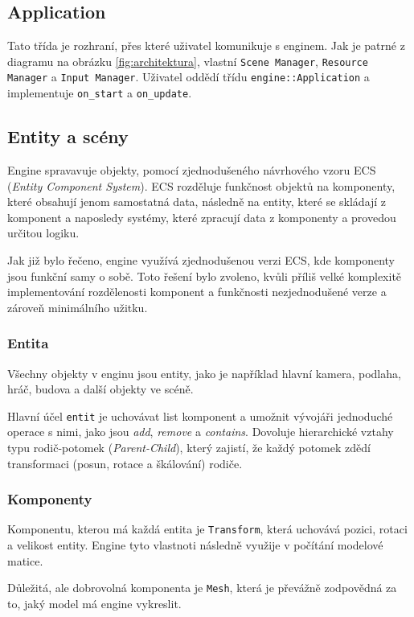 \documentclass[12pt,a4paper]{article}
\begin{document}
\subsection{Application}
Tato třída je rozhraní, přes které uživatel komunikuje s enginem. Jak je patrné z diagramu na obrázku \ref{fig:architektura}, vlastní \texttt{Scene Manager}, \texttt{Resource Manager} a \texttt{Input Manager}. Uživatel oddědí třídu \texttt{engine::Application} a implementuje \texttt{on\_start} a \texttt{on\_update}.

\subsection{Entity a scény}
Engine spravavuje objekty, pomocí zjednodušeného návrhového vzoru ECS (\textit{Entity Component System}). ECS rozděluje funkčnost objektů na komponenty, které obsahují jenom samostatná data, následně na entity, které se skládají z komponent a naposledy systémy, které zpracují data z komponenty a provedou určitou logiku.

Jak již bylo řečeno, engine využívá zjednodušenou verzi ECS, kde komponenty jsou funkční samy o sobě. Toto řešení bylo zvoleno, kvůli příliš velké komplexitě implementování rozdělenosti komponent a funkčnosti nezjednodušené verze a zároveň minimálního užitku.

\subsubsection{Entita}
Všechny objekty v enginu jsou entity, jako je například hlavní kamera, podlaha, hráč,  budova a další objekty ve scéně.

Hlavní účel \texttt{entit} je uchovávat list komponent a umožnit vývojáři jednoduché operace s nimi, jako jsou \textit{add}, \textit{remove} a \textit{contains}. Dovoluje hierarchické vztahy typu rodič-potomek (\textit{Parent-Child}), který zajistí, že každý potomek zdědí transformaci (posun, rotace a škálování) rodiče.

\subsubsection{Komponenty}
Komponentu, kterou má každá entita je \texttt{Transform}, která uchovává pozici, rotaci a velikost entity. Engine tyto vlastnoti následně využije v počítání modelové matice.

Důležitá, ale dobrovolná komponenta je \texttt{Mesh}, která je převážně zodpovědná za to, jaký model má engine vykreslit.
\end{document}
